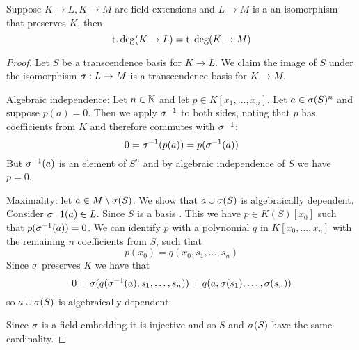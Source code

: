\begin{lem}
    Suppose $K \to L, K \to M$ are field extensions and 
    $L \to M$ is a an isomorphism that preserves $K$,
    then 
    \[\operatorname{t.deg}(K \to L) = \operatorname{t.deg}(K \to M)\]
\end{lem}
\begin{proof}
    Let $S$ be a transcendence basis for $K \to L$.
    We claim the image of $S$ under the isomorphism $\sigma: L \to M$ is 
    a transcendence basis for $K \to M$.

    Algebraic independence: Let $n \in \mathbb{N}$ and 
    let $p \in K[x_1,\dots,x_n]$. 
    Let $a \in \sigma(S)^n$ and suppose $p(a) = 0$.
    Then we apply $\sigma^{-1}$ to both sides, 
    noting that $p$ has coefficients 
    from $K$ and therefore commutes with $\sigma^{-1}$:
    \[0 = \sigma^{-1}(p(a)) = p(\sigma^{-1}(a))\]
    But $\sigma^{-1}(a)$ is an element of $S^n$
    and by algebraic independence of $S$ we have $p = 0$.

    Maximality: let $a \in M \setminus \sigma(S)$. 
    We show that $a \cup \sigma(S)$ is algebraically dependent.
    Consider $\sigma^-1(a) \in L$.
    Since $S$ is a basis 
    .
    This we have $p \in K(S)[x_0]$ such that 
    $p(\sigma^{-1}(a)) = 0$.
    We can identify $p$ with a polynomial $q$ in $K[x_0,\dots,x_n]$ 
    with the remaining $n$ coefficients from $S$,
    such that 
    \[p(x_0) = q(x_0,s_1,\dots,s_n)\]
    Since $\sigma$ preserves $K$ we have that 
    \[0 = \sigma(q(\sigma^{-1}(a),s_1,\dots,s_n)) = q(a, \sigma(s_1),\dots,\sigma(s_n))\]
    so $a \cup \sigma(S)$ is algebraically dependent.

    Since $\sigma$ is a field embedding it is injective and so 
    $S$ and $\sigma(S)$ have the same cardinality.
\end{proof}

